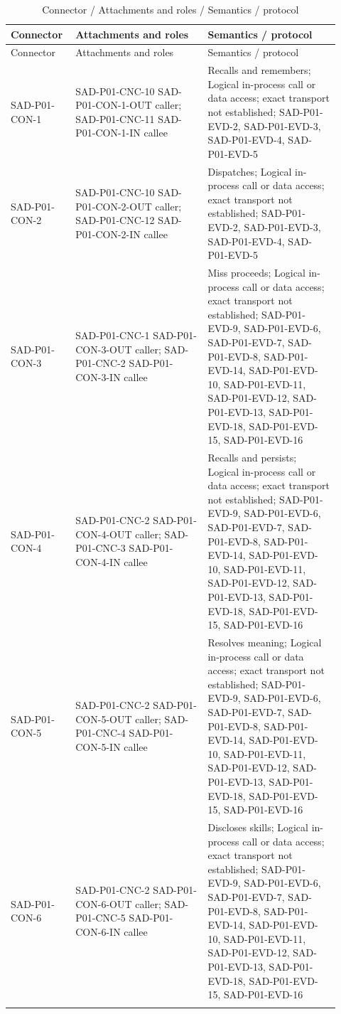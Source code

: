 \documentclass[10pt,letterpaper]{article}
\begin{document}
\begin{longtable}{@{}>{\raggedright\arraybackslash}p{0.16\linewidth}>{\raggedright\arraybackslash}p{0.38\linewidth}>{\raggedright\arraybackslash}p{0.38\linewidth}@{}}
\caption{Connector / Attachments and roles / Semantics / protocol}\\
\toprule Connector & Attachments and roles & Semantics / protocol\\\midrule\endfirsthead
\toprule Connector & Attachments and roles & Semantics / protocol\\\midrule\endhead
SAD-P01-CON-1 & SAD-P01-CNC-10 SAD-P01-CON-1-OUT caller; SAD-P01-CNC-11 SAD-P01-CON-1-IN callee & Recalls and remembers; Logical in-process call or data access; exact transport not established; SAD-P01-EVD-2, SAD-P01-EVD-3, SAD-P01-EVD-4, SAD-P01-EVD-5\\\addlinespace
SAD-P01-CON-2 & SAD-P01-CNC-10 SAD-P01-CON-2-OUT caller; SAD-P01-CNC-12 SAD-P01-CON-2-IN callee & Dispatches; Logical in-process call or data access; exact transport not established; SAD-P01-EVD-2, SAD-P01-EVD-3, SAD-P01-EVD-4, SAD-P01-EVD-5\\\addlinespace
SAD-P01-CON-3 & SAD-P01-CNC-1 SAD-P01-CON-3-OUT caller; SAD-P01-CNC-2 SAD-P01-CON-3-IN callee & Miss proceeds; Logical in-process call or data access; exact transport not established; SAD-P01-EVD-9, SAD-P01-EVD-6, SAD-P01-EVD-7, SAD-P01-EVD-8, SAD-P01-EVD-14, SAD-P01-EVD-10, SAD-P01-EVD-11, SAD-P01-EVD-12, SAD-P01-EVD-13, SAD-P01-EVD-18, SAD-P01-EVD-15, SAD-P01-EVD-16\\\addlinespace
SAD-P01-CON-4 & SAD-P01-CNC-2 SAD-P01-CON-4-OUT caller; SAD-P01-CNC-3 SAD-P01-CON-4-IN callee & Recalls and persists; Logical in-process call or data access; exact transport not established; SAD-P01-EVD-9, SAD-P01-EVD-6, SAD-P01-EVD-7, SAD-P01-EVD-8, SAD-P01-EVD-14, SAD-P01-EVD-10, SAD-P01-EVD-11, SAD-P01-EVD-12, SAD-P01-EVD-13, SAD-P01-EVD-18, SAD-P01-EVD-15, SAD-P01-EVD-16\\\addlinespace
SAD-P01-CON-5 & SAD-P01-CNC-2 SAD-P01-CON-5-OUT caller; SAD-P01-CNC-4 SAD-P01-CON-5-IN callee & Resolves meaning; Logical in-process call or data access; exact transport not established; SAD-P01-EVD-9, SAD-P01-EVD-6, SAD-P01-EVD-7, SAD-P01-EVD-8, SAD-P01-EVD-14, SAD-P01-EVD-10, SAD-P01-EVD-11, SAD-P01-EVD-12, SAD-P01-EVD-13, SAD-P01-EVD-18, SAD-P01-EVD-15, SAD-P01-EVD-16\\\addlinespace
SAD-P01-CON-6 & SAD-P01-CNC-2 SAD-P01-CON-6-OUT caller; SAD-P01-CNC-5 SAD-P01-CON-6-IN callee & Discloses skills; Logical in-process call or data access; exact transport not established; SAD-P01-EVD-9, SAD-P01-EVD-6, SAD-P01-EVD-7, SAD-P01-EVD-8, SAD-P01-EVD-14, SAD-P01-EVD-10, SAD-P01-EVD-11, SAD-P01-EVD-12, SAD-P01-EVD-13, SAD-P01-EVD-18, SAD-P01-EVD-15, SAD-P01-EVD-16\\\addlinespace

\end{longtable}
\end{document}
